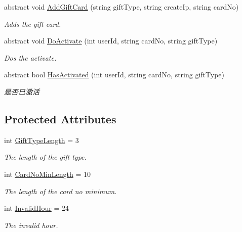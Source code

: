 \begin{DoxyCompactItemize}
abstract void \mbox{\hyperlink{class_t_net_1_1_com_1_1_generic_1_1_channel_gift_aedb6603b56402c2094c4645be1cb3e63}{Add\+Gift\+Card}} (string gift\+Type, string create\+Ip, string card\+No)
\begin{DoxyCompactList}\small\item\em Adds the gift card. \end{DoxyCompactList}\item 
abstract void \mbox{\hyperlink{class_t_net_1_1_com_1_1_generic_1_1_channel_gift_a9dc52c5c418e162b3c8998b2d78c87ee}{Do\+Activate}} (int user\+Id, string card\+No, string gift\+Type)
\begin{DoxyCompactList}\small\item\em Dos the activate. \end{DoxyCompactList}\item 
abstract bool \mbox{\hyperlink{class_t_net_1_1_com_1_1_generic_1_1_channel_gift_a9c446be6e9fe2d7db66c4c81b203131b}{Has\+Activated}} (int user\+Id, string card\+No, string gift\+Type)
\begin{DoxyCompactList}\small\item\em 是否已激活 \end{DoxyCompactList}\end{DoxyCompactItemize}
\subsection*{Protected Attributes}
\begin{DoxyCompactItemize}
\item 
int \mbox{\hyperlink{class_t_net_1_1_com_1_1_generic_1_1_channel_gift_aa72d615b17d8d2af86d6e82102ac6dc8}{Gift\+Type\+Length}} = 3
\begin{DoxyCompactList}\small\item\em The length of the gift type. \end{DoxyCompactList}\item 
int \mbox{\hyperlink{class_t_net_1_1_com_1_1_generic_1_1_channel_gift_aee569eb0759562e806cf3c987304f3f4}{Card\+No\+Min\+Length}} = 10
\begin{DoxyCompactList}\small\item\em The length of the card no minimum. \end{DoxyCompactList}\item 
int \mbox{\hyperlink{class_t_net_1_1_com_1_1_generic_1_1_channel_gift_a6a58c78803a96279168107cca58e0253}{Invalid\+Hour}} = 24
\begin{DoxyCompactList}\small\item\em The invalid hour. \end{DoxyCompactList}\end{DoxyCompactItemize}
